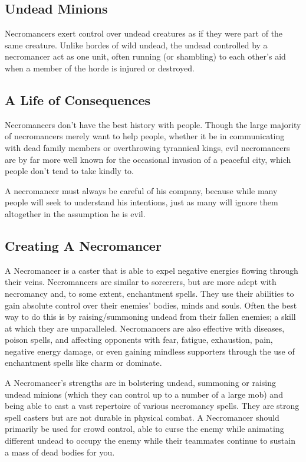 \subsection{Undead Minions}
Necromancers exert control over undead creatures as if they were part of the same creature. Unlike hordes of wild undead, the undead controlled by a necromancer act as one unit, often running (or shambling) to each other’s aid when a member of the horde is injured or destroyed.

\newpage
\subsection{A Life of Consequences}
Necromancers don’t have the best history with people. Though the large majority of necromancers merely want to help people, whether it be in communicating with dead family members or overthrowing tyrannical kings, evil necromancers are by far more well known for the occasional invasion of a peaceful city, which people don’t tend to take kindly to.

A necromancer must always be careful of his company, because while many people will seek to understand his intentions, just as many will ignore them altogether in the assumption he is evil.

\subsection{Creating A Necromancer}
A Necromancer is a caster that is able to expel negative energies flowing through their veins. Necromancers are similar to sorcerers, but are more adept with necromancy and, to some extent, enchantment spells. They use their abilities to gain absolute control over their enemies' bodies, minds and souls. Often the best way to do this is by raising/summoning undead from their fallen enemies; a skill at which they are unparalleled. Necromancers are also effective with diseases, poison spells, and affecting opponents with fear, fatigue, exhaustion, pain, negative energy damage, or even gaining mindless supporters through the use of enchantment spells like charm or dominate.

A Necromancer's strengths are in bolstering undead, summoning or raising undead minions (which they can control up to a number of a large mob) and being able to cast a vast repertoire of various necromancy spells. They are strong spell casters but are not durable in physical combat. A Necromancer should primarily be used for crowd control, able to curse the enemy while animating different undead to occupy the enemy while their teammates continue to sustain a mass of dead bodies for you.

